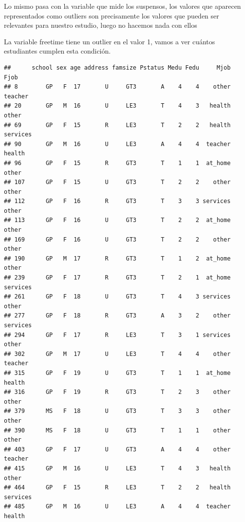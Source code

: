 \documentclass[]{article}
\newenvironment{Shaded}{\begin{snugshade}}{\end{snugshade}}
\newcommand{\DecValTok}[1]{\textcolor[rgb]{0.86,0.86,0.80}{#1}}
\newcommand{\NormalTok}[1]{\textcolor[rgb]{0.80,0.80,0.80}{#1}}
\newcommand{\OperatorTok}[1]{\textcolor[rgb]{0.94,0.94,0.82}{#1}}
\begin{document}
Lo mismo pasa con la variable que mide los suspensos, los valores que
aparecen representados como outliers son precisamente los valores que
pueden ser relevantes para nuestro estudio, luego no hacemos nada con
ellos

La variable freetime tiene un outlier en el valor 1, vamos a ver cuántos
estudiantes cumplen esta condición.

\begin{Shaded}
\end{Shaded}

\begin{verbatim}
##      school sex age address famsize Pstatus Medu Fedu     Mjob     Fjob
## 8        GP   F  17       U     GT3       A    4    4    other  teacher
## 20       GP   M  16       U     LE3       T    4    3   health    other
## 69       GP   F  15       R     LE3       T    2    2   health services
## 90       GP   M  16       U     LE3       A    4    4  teacher   health
## 96       GP   F  15       R     GT3       T    1    1  at_home    other
## 107      GP   F  15       U     GT3       T    2    2    other    other
## 112      GP   F  16       R     GT3       T    3    3 services    other
## 113      GP   F  16       U     GT3       T    2    2  at_home    other
## 169      GP   F  16       U     GT3       T    2    2    other    other
## 190      GP   M  17       R     GT3       T    1    2  at_home    other
## 239      GP   F  17       R     GT3       T    2    1  at_home services
## 261      GP   F  18       U     GT3       T    4    3 services    other
## 277      GP   F  18       R     GT3       A    3    2    other services
## 294      GP   F  17       R     LE3       T    3    1 services    other
## 302      GP   M  17       U     LE3       T    4    4    other  teacher
## 315      GP   F  19       U     GT3       T    1    1  at_home   health
## 316      GP   F  19       R     GT3       T    2    3    other    other
## 379      MS   F  18       U     GT3       T    3    3    other    other
## 390      MS   F  18       U     GT3       T    1    1    other    other
## 403      GP   F  17       U     GT3       A    4    4    other  teacher
## 415      GP   M  16       U     LE3       T    4    3   health    other
## 464      GP   F  15       R     LE3       T    2    2   health services
## 485      GP   M  16       U     LE3       A    4    4  teacher   health

\end{verbatim}
\end{document}
